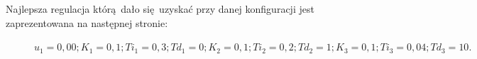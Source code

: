 

%     



%     



%     


Najlepsza regulacja którą dało się uzyskać przy danej konfiguracji jest zaprezentowana na następnej stronie:

\begin{figure}[H]
    \centering
    
    \caption{$u_1 = 0,00; K_1 = 0,1; Ti_1 = 0,3; Td_1 = 0; K_2 = 0,1; Ti_2 = 0,2; Td_2 = 1; K_3 = 0,1; Ti_3 = 0,04; Td_3 = 10.$}
\end{figure}

